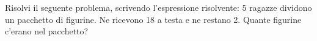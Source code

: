 \item Risolvi il seguente problema, scrivendo l'espressione risolvente: 5 ragazze dividono un pacchetto di figurine. Ne ricevono 18 a testa e ne restano 2. Quante figurine c'erano nel pacchetto?